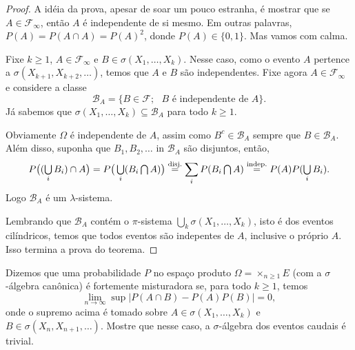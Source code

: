\begin{proof}
  A idéia da prova, apesar de soar um pouco estranha, é mostrar que se $A \in \mathcal{F}_\infty$, então $A$ é independente de si mesmo.
  Em outras palavras, $P(A) = P(A \cap A) = P(A)^2$, donde $P(A) \in \{0,1\}$.
  Mas vamos com calma.

  Fixe $k \geq 1$, $A \in \mathcal{F}_\infty$ e $B \in \sigma(X_1, \dots, X_k)$.
  Nesse caso, como o evento $A$ pertence a $\sigma(X_{k+1}, X_{k+2}, \dots)$, temos que $A$ e $B$ são independentes.
  Fixe agora $A \in \mathcal{F}_\infty$ e considere a classe
  \begin{equation}
    \mathcal{B}_A = \{B \in \mathcal{F}; \text{ $B$ é independente de $A$}\}.
  \end{equation}
  Já sabemos que $\sigma(X_1, \dots, X_k) \subseteq \mathcal{B}_A$ para todo $k \geq 1$.

  Obviamente $\Omega$ é independente de $A$, assim como $B^c \in \mathcal{B}_A$ sempre que $B \in \mathcal{B}_A$.
  Além disso, suponha que $B_1, B_2, \dots$ in $\mathcal{B}_A$ são disjuntos, então,
  \begin{equation*}
    P\big( (\operatorname*{{\textstyle \bigcup}}_i B_i) \cap A \big) = P\big( \operatorname*{{\textstyle \bigcup}}_i (B_i \operatorname*{{\textstyle \bigcap}} A) \big) \overset{\text{disj.}}= \sum_i P(B_i \operatorname*{{\textstyle \bigcap}} A) \overset{\text{indep.}}= P(A) P(\operatorname*{{\textstyle \bigcup}}_i B_i).
  \end{equation*}
  Logo $\mathcal{B}_A$ é um $\lambda$-sistema.

  Lembrando que $\mathcal{B}_A$ contém o $\pi$-sistema $\bigcup_k \sigma(X_1, \dots, X_k)$, isto é dos eventos cilíndricos, temos que todos eventos são indepentes de $A$, inclusive o próprio $A$.
  Isso termina a prova do teorema.
\end{proof}

\begin{exercise}
  Dizemos que uma probabilidade $P$ no espaço produto $\Omega = \times_{n \geq 1} E$ (com a $\sigma$-álgebra canônica) é fortemente misturadora se, para todo $k \geq 1$, temos
  \begin{equation}
    \lim_{n \to \infty} \sup \big| P(A \cap B) - P(A) P(B) \big| = 0,
  \end{equation}
  onde o supremo acima é tomado sobre $A \in \sigma(X_1, \dots, X_k)$ e $B \in \sigma(X_n, X_{n+1}, \dots)$.
  Mostre que nesse caso, a $\sigma$-álgebra dos eventos caudais é trivial.
\end{exercise}


